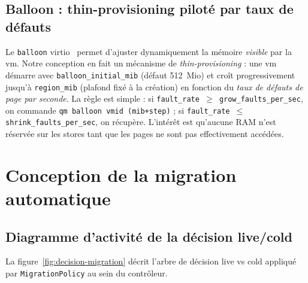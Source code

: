 \subsection{Balloon : thin-provisioning piloté par taux de défauts}

Le \texttt{balloon} virtio~\cite{qemu_balloon,waldspurger_2002} permet d'ajuster dynamiquement la mémoire \emph{visible} par la \acrshort{vm}. Notre conception en fait un mécanisme de \emph{thin-provisioning} : une \acrshort{vm} démarre avec \texttt{balloon\_initial\_mib} (défaut 512~Mio) et croît progressivement jusqu'à \texttt{region\_mib} (plafond fixé à la création) en fonction du \emph{taux de défauts de page par seconde}. La règle est simple : si \texttt{fault\_rate $\ge$ grow\_faults\_per\_sec}, on commande \texttt{qm balloon vmid (mib+step)} ; si \texttt{fault\_rate $\le$ shrink\_faults\_per\_sec}, on récupère. L'intérêt est qu'aucune RAM n'est réservée sur les stores tant que les pages ne sont pas effectivement accédées.

\section{Conception de la migration automatique}
\label{sec:conception-migration}

\subsection{Diagramme d'activité de la décision live/cold}

La figure~\ref{fig:decision-migration} décrit l'arbre de décision live vs cold appliqué par \texttt{MigrationPolicy} au sein du contrôleur.

